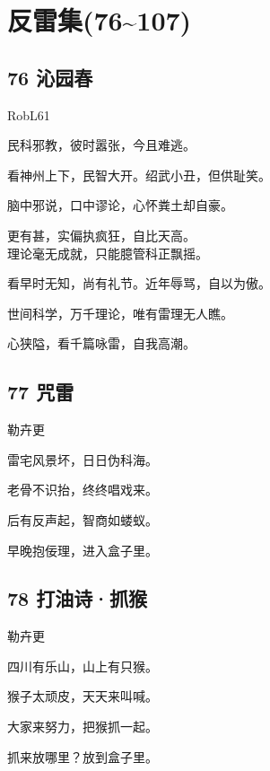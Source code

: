 \documentclass[UTF8,12pt,oneside]{ctexbook}
\def\pau#1{\begin{center} {#1} \end{center}} %
\def\pst#1{\begin{center}\Large \kaishu {#1} \songti \large \end{center}}%
\def\poem#1#2{\section{#1}\pau{#2}} %
\def\poemwithst#1#2#3{\section{#1}\pst{#2}\pau{#3}} %
\def\lid{\setlength\parindent{5em}}
\def\lidend{\setlength\parindent{2em}}
\begin{document}
    \tableofcontents %
    
    \chapter{反雷集(76\textasciitilde107)} %
    
    \large %
    
    \poemwithst{76 沁园春}{小改咏雷版}{RobL61} %
        
        \lid
        
        民科邪教，彼时嚣张，今且难逃。
        
        看神州上下，民智大开。绍武小丑，但供耻笑。
        
        脑中邪说，口中谬论，心怀粪土却自豪。
        
        更有甚，实偏执疯狂，自比天高。 
        ~\\
        
        理论毫无成就，只能臆管科正飘摇。
        
        看早时无知，尚有礼节。近年辱骂，自以为傲。
        
        世间科学，万千理论，唯有雷理无人瞧。
        
        心狭隘，看千篇咏雷，自我高潮。
        
        \lidend

        
    \newpage %
        
    \poem{77 咒雷}{勒卉更} %
                       \begin{center}
                       雷宅风景坏，日日伪科海。

                       老骨不识抬，终终唱戏来。 

                       后有反声起，智商如蝼蚁。 

                       早晚抱佞理，进入盒子里。
                       \end{center}
        
        
    \poem{78 打油诗·抓猴}{勒卉更} %
        
        \begin{center} %
        四川有乐山，山上有只猴。

        猴子太顽皮，天天来叫喊。

        大家来努力，把猴抓一起。

        抓来放哪里？放到盒子里。

        \end{center}
    
\end{document}
